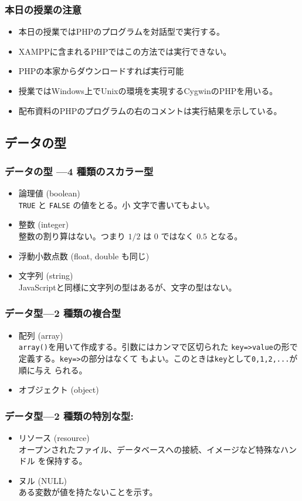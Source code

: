 \begin{frame}[containsverbatim]
 \frametitle{本日の授業の注意}
 \begin{itemize}
  \item 本日の授業ではPHPのプログラムを対話型で実行する。
  \item XAMPPに含まれるPHPではこの方法では実行できない。
	\item PHPの本家からダウンロードすれば実行可能
  \item 授業ではWindows上でUnixの環境を実現するCygwinのPHPを用いる。
  \item 配布資料のPHPのプログラムの右のコメントは実行結果を示している。
 \end{itemize}
\end{frame}
\subsection{データの型}
\begin{frame}[containsverbatim]
\frametitle{データの型 ---4 種類のスカラー型}
 \begin{itemize}
  \item 論理値 (boolean)\\\texttt{TRUE} と \texttt{FALSE} の値をとる。小
	文字で書いてもよい。
  \item 整数 (integer)\\整数の割り算はない。つまり $1/2$ は $0$ ではなく
	$0.5$ となる。
  \item 浮動小数点数 (float, double も同じ)
  \item 文字列 (string)\\
JavaScriptと同様に文字列の型はあるが、文字の型はない。
 \end{itemize}
\end{frame}
\begin{frame}[containsverbatim]
\frametitle{データ型---2 種類の複合型}
 \begin{itemize}
  \item 配列 (array)\\
\texttt{array()}を用いて作成する。引数にはカンマで区切られた
	\texttt{key=>value}の形で定義する。\texttt{key=>}の部分はなくて
	もよい。このときは\texttt{key}として\texttt{0,1,2,...}が順に与え
	られる。
  \item オブジェクト (object)
 \end{itemize}
\end{frame}
\begin{frame}[containsverbatim]
\frametitle{データ型---2 種類の特別な型:}
\begin{itemize}
 \item リソース (resource)\\
オープンされたファイル、データベースへの接続、イメージなど特殊なハンドル
       を保持する。
 \item ヌル (NULL)\\
ある変数が値を持たないことを示す。
\end{itemize}
\end{frame}

